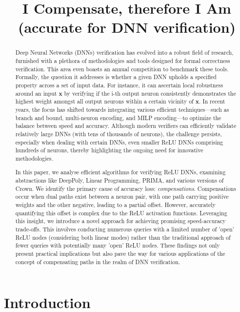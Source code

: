 \documentclass[a4paper,UKenglish,cleveref, autoref, thm-restate]{lipics-v2021}
\title{I Compensate, therefore I Am \\ (accurate for DNN verification)}
\date{}
\newcommand{\vx}{\boldsymbol{x}}
\begin{document}
	
	\maketitle
	
	\begin{abstract}
		
		Deep Neural Networks (DNNs) verification has evolved into a robust field of research, furnished with a plethora of methodologies and tools designed for formal correctness verification. This area even boasts an annual competition to benchmark these tools. Formally, the question it addresses is whether a given DNN upholds a specified property across a set of input data. For instance, it can ascertain local robustness around an input $\vx$ by verifying if the i-th output neuron consistently demonstrates the highest weight amongst all output neurons within a certain vicinity of $\vx$. In recent years, the focus has shifted towards integrating various efficient techniques—such as branch and bound, multi-neuron encoding, and MILP encoding—to optimize the balance between speed and accuracy. Although modern verifiers can efficiently validate relatively large DNNs (with tens of thousands of neurons), the challenge persists, especially when dealing with certain DNNs, even smaller ReLU DNNs comprising hundreds of neurons, thereby highlighting the ongoing need for innovative methodologies.
		
		In this paper, we analyse efficient algorithms  for verifying ReLU DNNs, examining abstractions like DeepPoly, Linear Programming, PRIMA, and various versions of Crown. We identify the primary cause of accuracy loss: {\em compensations}. Compensations occur when dual paths exist between a neuron pair, with one path carrying positive weights and the other negative, leading to a partial offset. However, accurately quantifying this offset is complex due to the ReLU activation functions. Leveraging this insight, we introduce a novel approach for achieving promising speed-accuracy trade-offs. This involves conducting numerous queries with a limited number of 'open' ReLU nodes (considering both linear modes) rather than the traditional approach of fewer queries with potentially many 'open' ReLU nodes. These findings not only present practical implications but also pave the way for various applications of the concept of compensating paths in the realm of DNN verification.
		
		
	\end{abstract}
	
	
	\section{Introduction}
	
\end{document}
